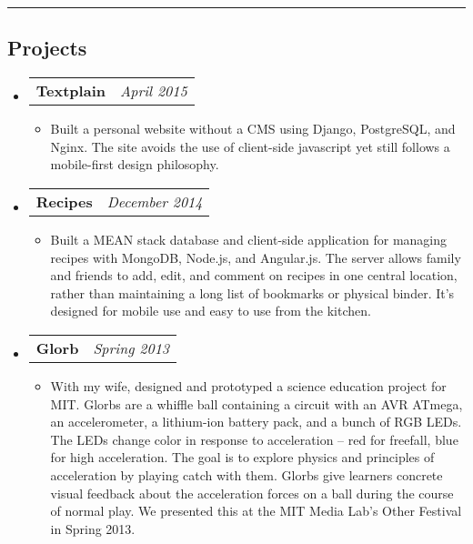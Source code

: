 \documentclass[10pt,letterpaper]{article}
\makeatletter
\newcommand{\headerrow}[2]
{\begin{tabular*}{\linewidth}{l@{\extracolsep{\fill}}r}
	#1 & #2 \\
\end{tabular*}}
\makeatother
\begin{document}
\hrule
\vspace{-0.4em}
\subsection*{Projects}
    \begin{itemize}
        \item \headerrow{\textbf{Textplain}}{\emph{April 2015}}
        \begin{itemize}
            \item Built a personal website without a CMS using Django,
                PostgreSQL, and Nginx.  The site avoids the use of client-side
                javascript yet still follows a mobile-first design philosophy.
        \end{itemize}

        \item \headerrow{\textbf{Recipes}}{\emph{December 2014}}
        \begin{itemize}
            \item Built a MEAN stack database and client-side application for
                managing recipes with MongoDB, Node.js, and Angular.js.  The
                server allows family and friends to add, edit, and comment on
                recipes in one central location, rather than maintaining a long
                list of bookmarks or physical binder.  It's designed for mobile
                use and easy to use from the kitchen.
        \end{itemize}

        \item \headerrow{\textbf{Glorb}}{\emph{Spring 2013}}
        \begin{itemize}
            \item With my wife, designed and prototyped a science education
                project for MIT\@.  Glorbs are a whiffle ball containing a
                circuit with an AVR ATmega, an accelerometer, a lithium-ion
                battery pack, and a bunch of RGB LEDs.  The LEDs change color
                in response to acceleration -- red for freefall, blue for high
                acceleration.  The goal is to explore physics and principles of
                acceleration by playing catch with them.  Glorbs give learners
                concrete visual feedback about the acceleration forces on a
                ball during the course of normal play.  We presented this at
                the MIT Media Lab's Other Festival in Spring 2013.
        \end{itemize}


\end{itemize}
\end{document}
